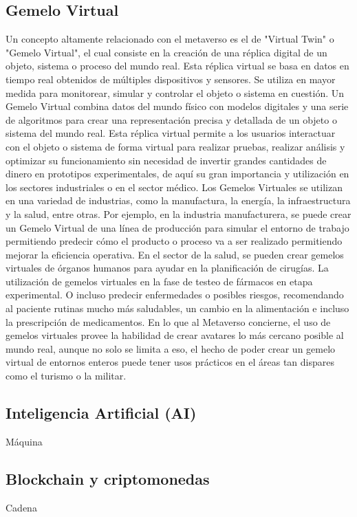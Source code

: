 \documentclass[a4paper,10pt]{article}
\begin{document}
	\subsection{Gemelo Virtual}
	Un concepto altamente relacionado con el metaverso es el de "Virtual Twin" o "Gemelo Virtual", el cual consiste en la creación de una réplica digital de un objeto, sistema o proceso del mundo real. Esta réplica virtual se basa en datos en tiempo real obtenidos de múltiples dispositivos y sensores. Se utiliza en mayor medida para monitorear, simular y controlar el objeto o sistema en cuestión.
	Un Gemelo Virtual combina datos del mundo físico con modelos digitales y una serie de algoritmos para crear una representación precisa y detallada de un objeto o sistema del mundo real. Esta réplica virtual permite a los usuarios interactuar con el objeto o sistema de forma virtual para realizar pruebas, realizar análisis y optimizar su funcionamiento sin necesidad de invertir grandes cantidades de dinero en prototipos experimentales, de aquí su gran importancia y utilización en los sectores industriales o en el sector médico.
	Los Gemelos Virtuales se utilizan en una variedad de industrias, como la manufactura, la energía, la infraestructura y la salud, entre otras. Por ejemplo, en la industria manufacturera, se puede crear un Gemelo Virtual de una línea de producción para simular el entorno de trabajo permitiendo predecir cómo el producto o proceso va a ser realizado permitiendo mejorar la eficiencia operativa. En el sector de la salud, se pueden crear gemelos virtuales de órganos humanos para ayudar en la planificación de cirugías. La utilización de gemelos virtuales en la fase de testeo de fármacos en etapa experimental. O incluso predecir enfermedades o posibles riesgos, recomendando al paciente rutinas mucho más saludables, un cambio en la alimentación e incluso la prescripción de medicamentos.
	En lo que al Metaverso concierne, el uso de gemelos virtuales provee la habilidad de crear avatares lo más cercano posible al mundo real, aunque no solo se limita a eso, el hecho de poder crear un gemelo virtual de entornos enteros puede tener usos prácticos en el áreas tan dispares como el turismo o la militar. 
	\subsection{Inteligencia Artificial (AI)}
	Máquina
	\subsection{Blockchain y criptomonedas}
	Cadena
\end{document}

